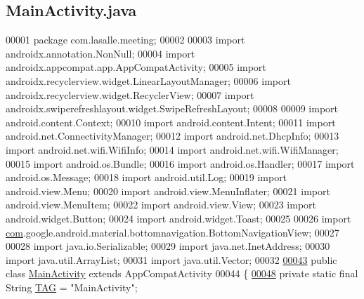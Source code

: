 \hypertarget{_main_activity_8java_source}{}\subsection{Main\+Activity.\+java}
\label{_main_activity_8java_source}

\begin{DoxyCode}
00001 \textcolor{keyword}{package }com.lasalle.meeting;
00002 
00003 \textcolor{keyword}{import} androidx.annotation.NonNull;
00004 \textcolor{keyword}{import} androidx.appcompat.app.AppCompatActivity;
00005 \textcolor{keyword}{import} androidx.recyclerview.widget.LinearLayoutManager;
00006 \textcolor{keyword}{import} androidx.recyclerview.widget.RecyclerView;
00007 \textcolor{keyword}{import} androidx.swiperefreshlayout.widget.SwipeRefreshLayout;
00008 
00009 \textcolor{keyword}{import} android.content.Context;
00010 \textcolor{keyword}{import} android.content.Intent;
00011 \textcolor{keyword}{import} android.net.ConnectivityManager;
00012 \textcolor{keyword}{import} android.net.DhcpInfo;
00013 \textcolor{keyword}{import} android.net.wifi.WifiInfo;
00014 \textcolor{keyword}{import} android.net.wifi.WifiManager;
00015 \textcolor{keyword}{import} android.os.Bundle;
00016 \textcolor{keyword}{import} android.os.Handler;
00017 \textcolor{keyword}{import} android.os.Message;
00018 \textcolor{keyword}{import} android.util.Log;
00019 \textcolor{keyword}{import} android.view.Menu;
00020 \textcolor{keyword}{import} android.view.MenuInflater;
00021 \textcolor{keyword}{import} android.view.MenuItem;
00022 \textcolor{keyword}{import} android.view.View;
00023 \textcolor{keyword}{import} android.widget.Button;
00024 \textcolor{keyword}{import} android.widget.Toast;
00025 
00026 \textcolor{keyword}{import} \hyperlink{namespacecom}{com}.google.android.material.bottomnavigation.BottomNavigationView;
00027 
00028 \textcolor{keyword}{import} java.io.Serializable;
00029 \textcolor{keyword}{import} java.net.InetAddress;
00030 \textcolor{keyword}{import} java.util.ArrayList;
00031 \textcolor{keyword}{import} java.util.Vector;
00032 
\hyperlink{classcom_1_1lasalle_1_1meeting_1_1_main_activity}{00043} \textcolor{keyword}{public} \textcolor{keyword}{class }\hyperlink{classcom_1_1lasalle_1_1meeting_1_1_main_activity}{MainActivity} \textcolor{keyword}{extends} AppCompatActivity
00044 \{
\hyperlink{classcom_1_1lasalle_1_1meeting_1_1_main_activity_a8f934680ad3a7ec4ad0fea748f0b7506}{00048}     \textcolor{keyword}{private} \textcolor{keyword}{static} \textcolor{keyword}{final} String \hyperlink{classcom_1_1lasalle_1_1meeting_1_1_main_activity_a8f934680ad3a7ec4ad0fea748f0b7506}{TAG} = \textcolor{stringliteral}{"MainActivity"};   

\end{DoxyCode}
